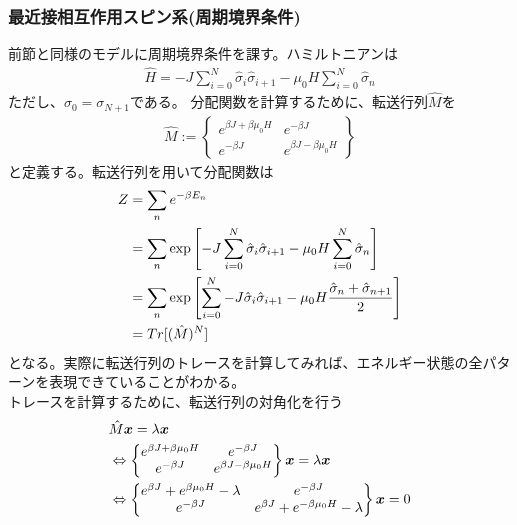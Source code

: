 \documentclass{jsarticle}  %
\numberwithin{equation}{section} %
\numberwithin{figure}{section}
\begin{document}
\subsubsection{最近接相互作用スピン系(周期境界条件)}
    前節と同様のモデルに周期境界条件を課す。ハミルトニアンは
    \begin{align}
        \hat{H} = -J\sum_{i = 0}^{N} \hat{\sigma}_i \hat{\sigma}_{i+1} - \mu_0 H \sum_{i=0}^{N}  \hat{\sigma}_n
    \end{align}
    ただし、$\sigma_0 = \sigma_{N+1}$である。
    分配関数を計算するために、転送行列$\hat{M}$を
    \begin{align}
        \hat{M} := \left\{  
        \begin{matrix}
            e^{\beta J + \beta \mu_0 H}& e^{-\beta J} \\
            e^{-\beta J}&e^{\beta J - \beta \mu_0 H}
        \end{matrix}
        \right\}
    \end{align}
    と定義する。転送行列を用いて分配関数は
    \begin{align}
        Z &= \sum_n e^{-\beta E_n} \notag \\
        &= \sum_n \exp \left[ -J\sum_{i = 0}^{N} \hat{\sigma}_i \hat{\sigma}_{i+1} - \mu_0 H \sum_{i=0}^{N}  \hat{\sigma}_n \right] \notag \\
        &= \sum_n \exp \left[ \sum_{i = 0}^{N} -J\hat{\sigma}_i \hat{\sigma}_{i+1} - \mu_0 H \frac{\hat{\sigma}_n + \hat{\sigma}_{n+1}}{2} \right] \notag \\
        &= Tr[ (\hat{M})^N] 
    \end{align}
    となる。実際に転送行列のトレースを計算してみれば、エネルギー状態の全パターンを表現できていることがわかる。\\
    トレースを計算するために、転送行列の対角化を行う
    \begin{align}
        &\hat{M}\bm{x} = \lambda \bm{x} \notag \\
        &\Leftrightarrow \left\{  
        \begin{matrix}
            e^{\beta J + \beta \mu_0 H}& e^{-\beta J} \\
            e^{-\beta J}&e^{\beta J - \beta \mu_0 H}
        \end{matrix}
        \right\}
        \bm{x} = \lambda \bm{x} \notag \\
        &\Leftrightarrow \left\{  
        \begin{matrix}
            e^{\beta J} + e^{\beta \mu_0 H} - \lambda & e^{-\beta J} \\
            e^{-\beta J}&e^{\beta J} + e^{- \beta \mu_0 H} - \lambda 
        \end{matrix}
        \right\} \bm{x} = 0
    \end{align}
\end{document}
